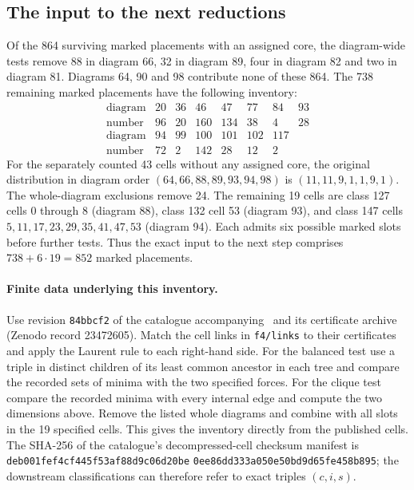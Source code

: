 \documentclass[11pt,letterpaper]{article}
\theoremstyle{definition}
\begin{document}
\subsection{The input to the next reductions}\label{early:input}

Of the 864 surviving marked placements with an assigned core, the
diagram-wide tests remove 88 in diagram 66, 32 in diagram 89, four in
diagram 82 and two in diagram 81. Diagrams 64, 90 and 98 contribute
none of these 864. The 738 remaining marked placements have the following
inventory:
\[
\begin{array}{c|rrrrrrr}
\text{diagram}&20&36&46&47&77&84&93\\
\text{number}&96&20&160&134&38&4&28\\[2pt]
\text{diagram}&94&99&100&101&102&117&\\
\text{number}&72&2&142&28&12&2&
\end{array}
\]
For the separately counted 43 cells without any assigned core, the
original distribution in diagram order $(64,66,88,89,93,94,98)$ is
$(11,11,9,1,1,9,1)$. The whole-diagram exclusions remove 24.
The remaining 19 cells are class 127 cells 0 through 8 (diagram 88),
class 132 cell 53 (diagram 93), and class 147 cells
$5,11,17,23,29,35,41,47,53$ (diagram 94). Each admits six possible
marked slots before further tests. Thus the exact input to the next
step comprises $738+6\cdot19=852$ marked placements.

\paragraph{Finite data underlying this inventory.}
Use revision \texttt{84bbcf2} of the catalogue accompanying~\cite{Tomar}
and its certificate archive (Zenodo record 23472605). Match the cell links in
\texttt{f4/links} to their certificates and apply the Laurent rule to each
right-hand side. For the balanced test use a triple in distinct children of
its least common ancestor in each tree and compare the recorded sets of minima
with the two specified forces. For the clique test compare the recorded minima
with every internal edge and compute the two dimensions above. Remove the
listed whole diagrams and combine with all slots in the 19 specified cells.
This gives the inventory directly from the published cells. The SHA-256 of
the catalogue's decompressed-cell checksum manifest is
\texttt{deb001fef4cf445f53af88d9c06d20be}\allowbreak
\texttt{0ee86dd333a050e50bd9d65fe458b895}; the downstream classifications
can therefore refer to exact triples $(c,i,s)$.
\end{document}
